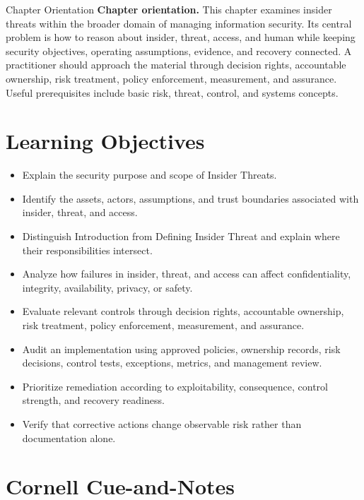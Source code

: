 \documentclass[11pt,letterpaper]{article}
\title{\CornellDocumentTitle}
\author{}
\date{}
\begin{document}
\maketitle
\begin{CornellOverviewBox}{Chapter Orientation}
\textbf{Chapter orientation.} This chapter examines insider threats within the broader domain of managing information security. Its central problem is how to reason about insider, threat, access, and human while keeping security objectives, operating assumptions, evidence, and recovery connected. A practitioner should approach the material through decision rights, accountable ownership, risk treatment, policy enforcement, measurement, and assurance. Useful prerequisites include basic risk, threat, control, and systems concepts.
\end{CornellOverviewBox}
\section*{Learning Objectives}
\begin{itemize}
\item Explain the security purpose and scope of Insider Threats.
\item Identify the assets, actors, assumptions, and trust boundaries associated with insider, threat, and access.
\item Distinguish Introduction from Defining Insider Threat and explain where their responsibilities intersect.
\item Analyze how failures in insider, threat, and access can affect confidentiality, integrity, availability, privacy, or safety.
\item Evaluate relevant controls through decision rights, accountable ownership, risk treatment, policy enforcement, measurement, and assurance.
\item Audit an implementation using approved policies, ownership records, risk decisions, control tests, exceptions, metrics, and management review.
\item Prioritize remediation according to exploitability, consequence, control strength, and recovery readiness.
\item Verify that corrective actions change observable risk rather than documentation alone.
\end{itemize}
\section*{Cornell Cue-and-Notes}
\end{document}
